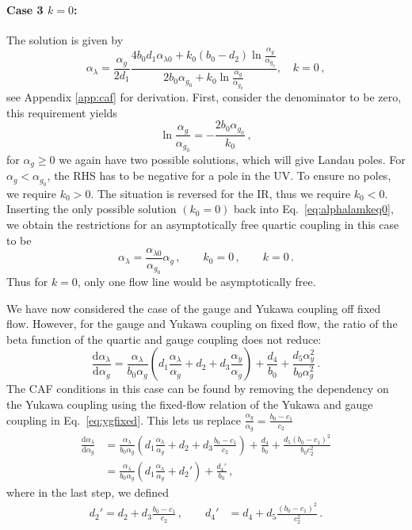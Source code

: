 \paragraph{Case 3 $k = 0$:}
The solution is given by
\begin{equation}
    \alpha_{\lambda} = \frac{\alpha_g}{2d_1} \frac{ 4b_0 d_1 \alpha_{\lambda0} + k_0 (b_0 - d_2) \ln\frac{\alpha_g}{\alpha_{g_0}} }{ 2b_0 \alpha_{g_0} + k_0 \ln\frac{\alpha_g}{\alpha_{g_0}} } , \quad k=0 \,,
    \label{eq:alphalamkeq0}
\end{equation}
see Appendix \ref{app:caf} for derivation. First, consider the denominator to be zero, this requirement yields
\begin{equation}
    \ln\frac{\alpha_g}{\alpha_{g_0}}=-\frac{2b_0\alpha_{g_0}}{k_0}\,,
\end{equation}
for $\alpha_g\ge0$ we again have two possible solutions, which will give Landau poles. For $\alpha_g<\alpha_{g_0}$, the RHS has to be negative for a pole in the UV. To ensure no poles, we require $k_0>0$. The situation is reversed for the IR, thus we require $k_0<0$. Inserting the only possible solution $(k_0=0)$ back into Eq.~\eqref{eq:alphalamkeq0}, we obtain the restrictions for an asymptotically free quartic coupling in this case to be
\begin{equation}
    \alpha_{\lambda} = \frac{ \alpha_{\lambda0}  }{ \alpha_{g_0}  } \alpha_g\,,\quad\quad k_0=0\,, \quad\quad k=0\,.\label{eq:CAFconk0}
\end{equation}
Thus for $k=0$, only one flow line would be asymptotically free. 

We have now considered the case of the gauge and Yukawa coupling off fixed flow. However, for the gauge and Yukawa coupling on fixed flow, the ratio of the beta function of the quartic and gauge coupling does not reduce:
\begin{equation}
    \frac{\text{d} \alpha_\lambda}{\text{d}\alpha_g}=\frac{\alpha_\lambda}{b_0\alpha_g}\left(d_1\frac{\alpha_\lambda}{\alpha_g} + d_2+d_3\frac{\alpha_y}{\alpha_g}\right)+\frac{d_4}{b_0}+\frac{d_5\alpha_y^2}{b_0\alpha_g^2}\,.
\end{equation}
The CAF conditions in this case can be found by removing the dependency on the Yukawa coupling using the fixed-flow relation of the Yukawa and gauge coupling in Eq.~\eqref{eq:ygfixed}. This lets us replace $\frac{\alpha_y}{\alpha_g}=\frac{b_0-c_1}{c_2}$ 
\begin{align}
    \frac{\text{d} \alpha_\lambda}{\text{d}\alpha_g}&=\frac{\alpha_\lambda}{b_0\alpha_g}\left(d_1\frac{\alpha_\lambda}{\alpha_g} + d_2+d_3\frac{b_0-c_1}{c_2}\right)+\frac{d_4}{b_0}+\frac{d_5(b_0-c_1)^2}{b_0c_2^2}\nonumber\\&=\frac{\alpha_\lambda}{b_0\alpha_g}\left(d_1\frac{\alpha_\lambda}{\alpha_g} + d_2'\right)+\frac{d_4'}{b_0}\,,
\end{align}
where in the last step, we defined
\begin{align}
    d_2'=d_2+d_3\frac{b_0-c_1}{c_2}\,,\quad\quad d_4'&={d_4}+d_5\frac{(b_0-c_1)^2}{c_2^2}\,.
\end{align}

